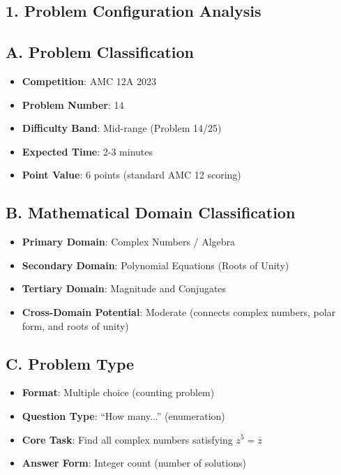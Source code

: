 \documentclass[11pt]{article}
\begin{document}
\begin{problembox}
\section*{1. Problem Configuration Analysis}

\subsection*{A. Problem Classification}
\begin{itemize}[leftmargin=*]
    \item \textbf{Competition}: AMC 12A 2023
    \item \textbf{Problem Number}: 14
    \item \textbf{Difficulty Band}: Mid-range (Problem 14/25)
    \item \textbf{Expected Time}: 2-3 minutes
    \item \textbf{Point Value}: 6 points (standard AMC 12 scoring)
\end{itemize}

\subsection*{B. Mathematical Domain Classification}
\begin{itemize}[leftmargin=*]
    \item \textbf{Primary Domain}: Complex Numbers / Algebra
    \item \textbf{Secondary Domain}: Polynomial Equations (Roots of Unity)
    \item \textbf{Tertiary Domain}: Magnitude and Conjugates
    \item \textbf{Cross-Domain Potential}: Moderate (connects complex numbers, polar form, and roots of unity)
\end{itemize}

\subsection*{C. Problem Type}
\begin{itemize}[leftmargin=*]
    \item \textbf{Format}: Multiple choice (counting problem)
    \item \textbf{Question Type}: ``How many...'' (enumeration)
    \item \textbf{Core Task}: Find all complex numbers satisfying $z^5 = \overline{z}$
    \item \textbf{Answer Form}: Integer count (number of solutions)
\end{itemize}


\end{problembox}
\end{document}
